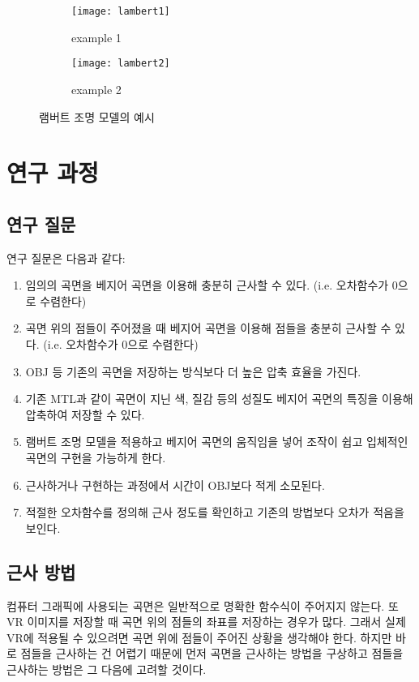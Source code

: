 \documentclass[10pt]{gshs-report-v2.0}
\theoremstyle{theorem}
\theoremstyle{lemma}
\theoremstyle{definition}
\begin{document}
\begin{figure}[h]
	\centering
	\begin{subfigure}{.45\textwidth}
		\centering
		\texttt{[image: lambert1]}
		\caption{example 1}
	\end{subfigure}
	\hfill
	\begin{subfigure}{.45\textwidth}
		\centering
		\texttt{[image: lambert2]}
		\caption{example 2}
	\end{subfigure}
	\caption{램버트 조명 모델의 예시}
\end{figure}

\section{연구 과정}

\subsection{연구 질문}
연구 질문은 다음과 같다:
\begin{enumerate}
	\item 임의의 곡면을 베지어 곡면을 이용해 충분히 근사할 수 있다. (i.e. 오차함수가 0으로 수렴한다)
	\item 곡면 위의 점들이 주어졌을 때 베지어 곡면을 이용해 점들을 충분히 근사할 수 있다. (i.e. 오차함수가 0으로 수렴한다)
	\item OBJ 등 기존의 곡면을 저장하는 방식보다 더 높은 압축 효율을 가진다.
	\item 기존 MTL과 같이 곡면이 지닌 색, 질감 등의 성질도 베지어 곡면의 특징을 이용해 압축하여 저장할 수 있다.
	\item 램버트 조명 모델을 적용하고 베지어 곡면의 움직임을 넣어 조작이 쉽고 입체적인 곡면의 구현을 가능하게 한다.
	\item 근사하거나 구현하는 과정에서 시간이 OBJ보다 적게 소모된다.
	\item 적절한 오차함수를 정의해 근사 정도를 확인하고 기존의 방법보다 오차가 적음을 보인다. 
\end{enumerate}

\subsection{근사 방법}
컴퓨터 그래픽에 사용되는 곡면은 일반적으로 명확한 함수식이 주어지지 않는다. 또 VR 이미지를 저장할 때 곡면 위의 점들의 좌표를 저장하는 경우가 많다. 그래서 실제 VR에 적용될 수 있으려면 곡면 위에 점들이 주어진 상황을 생각해야 한다. 하지만 바로 점들을 근사하는 건 어렵기 때문에 먼저 곡면을 근사하는 방법을 구상하고 점들을 근사하는 방법은 그 다음에 고려할 것이다. 
\end{document}
